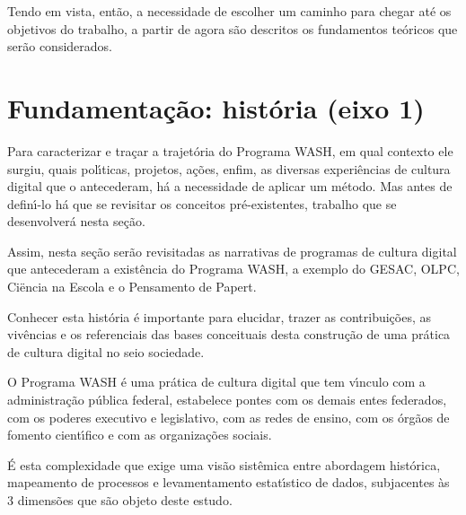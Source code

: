 \documentclass[
12pt,		%
openright,	%
twoside,  %
a4paper,			%
chapter=TITLE,		%
english,			%
french,				%
spanish,			%
brazil				%
]{USPSC-classe/USPSC}
\begin{document}
\noindent\begin{center}\mbox{\centering{}}\end{center}


Tendo em vista, ent\~ao, a necessidade de escolher um caminho para chegar at\'e os objetivos do trabalho, a partir de agora s\~ao descritos os fundamentos te\'oricos que ser\~ao considerados.


\section[Fundamenta\c{c}\~ao: hist\'oria (eixo 1)]{Fundamenta\c{c}\~ao: hist\'oria (eixo 1)}\label{Fundamenta\c{c}\~ao: hist\'oria (eixo 1)}
Para caracterizar e tra\c{c}ar a trajet\'oria do Programa WASH, em qual contexto ele surgiu, quais pol\'{\i}ticas, projetos, a\c{c}\~oes, enfim, as diversas experi\^encias de cultura digital que o antecederam, h\'a a necessidade de aplicar um m\'etodo. Mas antes de defin\'{\i}-lo h\'a que se revisitar os conceitos pr\'e-existentes, trabalho que se desenvolver\'a nesta se\c{c}\~ao.


Assim, nesta se\c{c}\~ao ser\~ao revisitadas as narrativas de programas de cultura digital que antecederam a exist\^encia do Programa WASH, a exemplo do GESAC, OLPC, Ciëncia na Escola e o Pensamento de Papert.


Conhecer esta hist\'oria \'e importante para elucidar, trazer as contribui\c{c}\~oes, as viv\^encias e os referenciais das bases conceituais desta constru\c{c}\~ao de uma pr\'atica de cultura digital no seio sociedade.


O Programa WASH \'e uma pr\'atica de cultura digital que tem v\'{\i}nculo com a administra\c{c}\~ao p\'ublica federal, estabelece pontes com os demais entes federados, com os poderes executivo e legislativo, com as redes de ensino, com os \'org\~aos de fomento cient\'{\i}fico e com as organiza\c{c}\~oes sociais.


\'E esta complexidade que exige uma vis\~ao sist\^emica entre abordagem hist\'orica, mapeamento de processos e levamentamento estat\'{\i}stico de dados, subjacentes \`as 3 dimens\~oes que s\~ao objeto deste estudo.
\end{document}
